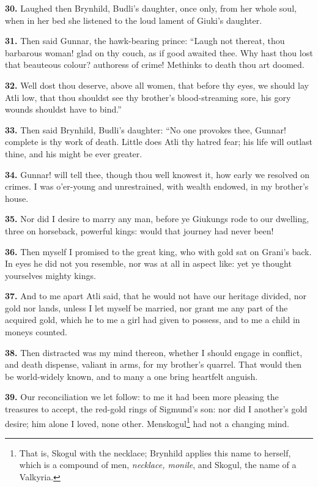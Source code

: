 \textbf{30.} Laughed then Brynhild, Budli's daughter, once only, from her
whole soul, when in her bed she listened to the loud lament of Giuki's
daughter.

\textbf{31.} Then said Gunnar, the hawk-bearing prince: ``Laugh not thereat,
thou barbarous woman! glad on thy couch, as if good awaited thee. Why
hast thou lost that beauteous colour? authoress of crime! Methinks to
death thou art doomed.

\textbf{32.} Well dost thou deserve, above all women, that before thy eyes,
we should lay Atli low, that thou shouldst see thy brother's
blood-streaming sore, his gory wounds shouldst have to bind.''

\textbf{33.} Then said Brynhild, Budli's daughter: ``No one provokes thee,
Gunnar! complete is thy work of death. Little does Atli thy hatred
fear; his life will outlast thine, and his might be ever greater.

\textbf{34.} Gunnar! will tell thee, though thou well knowest it, how early
we resolved on crimes. I was o'er-young and unrestrained, with wealth
endowed, in my brother's house.

\textbf{35.} Nor did I desire to marry any man, before ye Giukungs rode to
our dwelling, three on horseback, powerful kings: would that journey
had never been!

\textbf{36.} Then myself I promised to the great king, who with gold sat on
Grani's back. In eyes he did not you resemble, nor was at all in
aspect like: yet ye thought yourselves mighty kings.

\textbf{37.} And to me apart Atli said, that he would not have our heritage
divided, nor gold nor lands, unless I let myself be married, nor grant
me any part of the acquired gold, which he to me a girl had given to
possess, and to me a child in moneys counted.

\textbf{38.} Then distracted was my mind thereon, whether I should engage in
conflict, and death dispense, valiant in arms, for my brother's
quarrel. That would then be world-widely known, and to many a one
bring heartfelt anguish.

\textbf{39.} Our reconciliation we let follow: to me it had been more
pleasing the treasures to accept, the red-gold rings of Sigmund's
son: nor did I another's gold desire; him alone I loved, none other.
Menskogul\footnote{That is, Skogul with the necklace; Brynhild applies this
name to herself, which is a compound of men, \emph{necklace, monile}, and
Skogul, the name of a Valkyria.} had not a changing mind.

